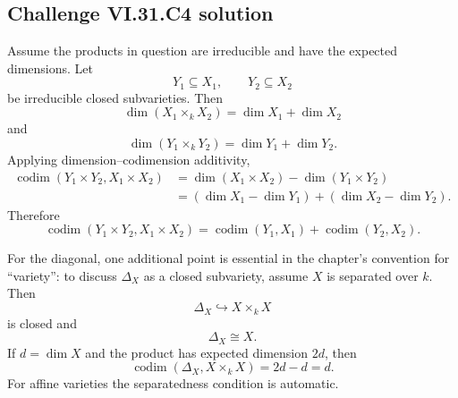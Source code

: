 \subsection*{Challenge VI.31.C4 solution}
\begin{solution}
Assume the products in question are irreducible and have the expected dimensions.  Let
\[
Y_1\subseteq X_1,
\qquad
Y_2\subseteq X_2
\]
be irreducible closed subvarieties.  Then
\[
\dim(X_1\times_kX_2)=\dim X_1+\dim X_2
\]
and
\[
\dim(Y_1\times_kY_2)=\dim Y_1+\dim Y_2.
\]
Applying dimension--codimension additivity,
\[
\begin{aligned}
\operatorname{codim}(Y_1\times Y_2,X_1\times X_2)
&=
\dim(X_1\times X_2)-\dim(Y_1\times Y_2)\\
&=
(\dim X_1-\dim Y_1)+(\dim X_2-\dim Y_2).
\end{aligned}
\]
Therefore
\[
\boxed{
\operatorname{codim}(Y_1\times Y_2,X_1\times X_2)
=
\operatorname{codim}(Y_1,X_1)
+
\operatorname{codim}(Y_2,X_2).
}
\]

For the diagonal, one additional point is essential in the chapter's convention for ``variety'': to discuss
\(\Delta_X\) as a closed subvariety, assume \(X\) is separated over \(k\).  Then
\[
\Delta_X\hookrightarrow X\times_kX
\]
is closed and
\[
\Delta_X\cong X.
\]
If \(d=\dim X\) and the product has expected dimension \(2d\), then
\[
\boxed{
\operatorname{codim}(\Delta_X,X\times_kX)=2d-d=d.
}
\]
For affine varieties the separatedness condition is automatic.
\end{solution}

